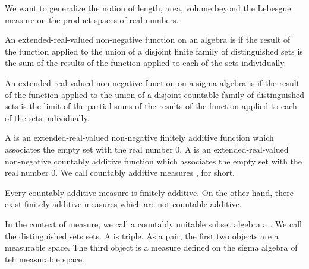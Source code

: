 
\sbasic















\sstart
{}


We want to generalize the notion
of length, area, volume beyond the
Lebesgue measure on the product spaces
of real numbers.


An extended-real-valued non-negative
function on an algebra is
if the result of the function applied to
the union of a disjoint finite family of
distinguished sets is the sum of the
results of the function applied to each
of the sets individually.

An extended-real-valued non-negative
function on a sigma algebra is
if the result of the function applied to
the union of a disjoint countable family of
distinguished sets is the limit of the partial
sums of the results of the function applied
to each of the sets individually.

A
is an extended-real-valued non-negative
finitely additive function which associates the empty
set with the real number $0$.
A
is an extended-real-valued non-negative
countably additive function which associates the empty
set with the real number $0$.
We call countably additive measures
, for short.

Every countably additive measure is finitely additive.
On the other hand, there exist finitely additive measures
which are not countable additive.

In the context of measure,
we call a countably unitable subset algebra
a .
We call the distinguished sets
sets.
A
is triple.
As a pair, the first two
objects are a measurable space.
The third object is a measure defined
on the sigma algebra of teh measurable space.

